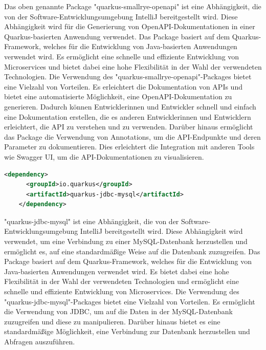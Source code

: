 Das oben genannte Package "quarkus-smallrye-openapi" ist eine Abhängigkeit, die von der Software-Entwicklungsumgebung IntelliJ bereitgestellt wird. Diese Abhängigkeit wird für die Generierung von OpenAPI-Dokumentationen in einer Quarkus-basierten Anwendung verwendet.
\newline
\newline
Das Package basiert auf dem Quarkus-Framework, welches für die Entwicklung von Java-basierten Anwendungen verwendet wird. Es ermöglicht eine schnelle und effiziente Entwicklung von Microservices und bietet dabei eine hohe Flexibilität in der Wahl der verwendeten Technologien.
\newpage
Die Verwendung des "quarkus-smallrye-openapi"-Packages bietet eine Vielzahl von Vorteilen. Es erleichtert die Dokumentation von APIs und bietet eine automatisierte Möglichkeit, eine OpenAPI-Dokumentation zu generieren. Dadurch können Entwicklerinnen und Entwickler schnell und einfach eine Dokumentation erstellen, die es anderen Entwicklerinnen und Entwicklern erleichtert, die API zu verstehen und zu verwenden.
\newline
\newline
Darüber hinaus ermöglicht das Package die Verwendung von Annotations, um die API-Endpunkte und deren Parameter zu dokumentieren. Dies erleichtert die Integration mit anderen Tools wie Swagger UI, um die API-Dokumentationen zu visualisieren.

\begin{lstlisting}[language=XML,caption=Dependency | jdbc-mysql,label=lst:impl:foo]
    <dependency>
      <groupId>io.quarkus</groupId>
      <artifactId>quarkus-jdbc-mysql</artifactId>
    </dependency>
\end{lstlisting}

"quarkus-jdbc-mysql" ist eine Abhängigkeit, die von der Software-Entwicklungsumgebung IntelliJ bereitgestellt wird. Diese Abhängigkeit wird verwendet, um eine Verbindung zu einer MySQL-Datenbank herzustellen und ermöglicht es, auf eine standardmäßige Weise auf die Datenbank zuzugreifen.
\newline
\newline
Das Package basiert auf dem Quarkus-Framework, welches für die Entwicklung von Java-basierten Anwendungen verwendet wird. Es bietet dabei eine hohe Flexibilität in der Wahl der verwendeten Technologien und ermöglicht eine schnelle und effiziente Entwicklung von Microservices.
\newline
\newline
Die Verwendung des "quarkus-jdbc-mysql"-Packages bietet eine Vielzahl von Vorteilen. Es ermöglicht die Verwendung von JDBC, um auf die Daten in der MySQL-Datenbank zuzugreifen und diese zu manipulieren. Darüber hinaus bietet es eine standardmäßige Möglichkeit, eine Verbindung zur Datenbank herzustellen und Abfragen auszuführen.

